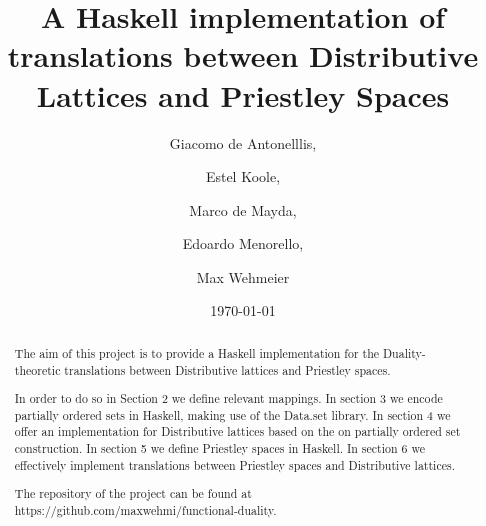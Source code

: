 \documentclass[12pt,a4paper]{article}
\title{A Haskell implementation of translations between Distributive Lattices and Priestley Spaces}
\author{Giacomo de Antonelllis, \and Estel Koole, \and Marco de Mayda, \and  Edoardo Menorello, \and  Max Wehmeier}
\date{\today}
\begin{document}
\maketitle


\begin{abstract}

The aim of this project is to provide a Haskell implementation for the Duality-theoretic translations between Distributive lattices and Priestley spaces.

In order to do so in Section 2 we define relevant mappings. In section 3 we encode partially ordered sets in Haskell, making use of the Data.set library. In section 4 we offer an implementation for Distributive lattices based on the on partially ordered set construction. In section 5 we define Priestley spaces in Haskell. In section 6 we effectively implement translations between Priestley spaces and Distributive lattices.





The repository of the project can be found at https://github.com/maxwehmi/functional-duality.
\end{abstract}


\tableofcontents

\clearpage























\end{document}
